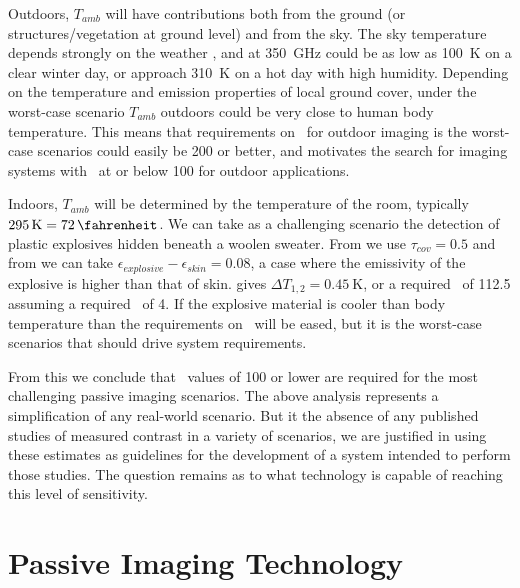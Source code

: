 Outdoors, $T_{amb}$ will have contributions both from the ground (or structures/vegetation at ground level) and from the sky.
The sky temperature depends strongly on the weather \cite{appleby_standoff_2007}, and at \SI{350}{\GHz} could be as low as \SI{100}{\K} on a clear winter day, or approach \SI{310}{\K} on a hot day with high humidity.
Depending on the temperature and emission properties of local ground cover, under the worst-case scenario $T_{amb}$ outdoors could be very close to human body temperature.
This means that requirements on \NETD\ for outdoor imaging is the worst-case scenarios could easily be \SI{200}{\mK} or better, and motivates the search for imaging systems with \NETD\ at or below \SI{100}{\mK} for outdoor applications. 

Indoors, $T_{amb}$ will be determined by the temperature of the room, typically $\SI{295}{\K} = \SI{72}{\fahrenheit}$.
We can take as a challenging scenario the detection of plastic explosives hidden beneath a woolen sweater.
From \cite{bjarnason_millimeter-wave_2004} we use $\tau_{cov} = 0.5$ and from \cite{appleby_standoff_2007} we can take $\epsilon_{explosive} - \epsilon_{skin} = 0.08$, a case where the emissivity of the explosive is higher than that of skin.
 gives $\Delta T_{1,2} = \SI{0.45}{\K}$, or a required \NETD\ of \SI{112.5}{\mK} assuming a required \SN\ of 4.
If the explosive material is cooler than body temperature than the requirements on \NETD\ will be eased, but it is the worst-case scenarios that should drive system requirements.

From this we conclude that \NETD\ values of \SI{100}{\mK} or lower are required for the most challenging passive imaging scenarios.
The above analysis represents a simplification of any real-world scenario.
But it the absence of any published studies of measured contrast in a variety of scenarios, we are justified in using these estimates as guidelines for the development of a system intended to perform those studies.
The question remains as to what technology is capable of reaching this level of sensitivity.

\section{Passive Imaging Technology} \label{sec:ch1-passive-tech}

